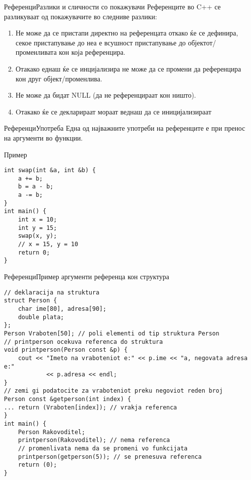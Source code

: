 \begin{frame}[fragile]{Референци}{Разлики и сличности со покажувачи}
Референците во C++ се разликуваат од покажувачите во следниве разлики:
\begin{enumerate}
  \item Не може да се пристапи директно на референцата откако ќе се дефинира,
  секое пристапување до неа е всушност пристапување до објектот/променливата кон
  која референцира.
  \item Отакако еднаш ќе се инцијализира не може да се промени да референцира
  кон друг објект/променлива.
  \item Не може да бидат NULL (да не референцираат кон ништо).
  \item Oтакако ќе се декларираат мораат веднаш да се иницијализираат
\end{enumerate}
\end{frame}

\begin{frame}[fragile]{Референци}{Употреба}
Една од најважните употреби на референците е при пренос на аргументи во функции.
\begin{exampleblock}{Пример}
\begin{lstlisting}
int swap(int &a, int &b) {
    a += b;
    b = a - b;
    a -= b;
}
int main() {
    int x = 10;
    int y = 15;
    swap(x, y);
    // x = 15, y = 10
    return 0;
}
\end{lstlisting}
\end{exampleblock}
\end{frame}

\begin{frame}[fragile]{Референци}{Пример аргументи референца кон структура}
\begin{lstlisting}
// deklaracija na struktura
struct Person {
    char ime[80], adresa[90];
    double plata;
};
Person Vraboten[50]; // poli elementi od tip struktura Person 
// printperson ocekuva referenca do struktura
void printperson(Person const &p) {
    cout << "Imeto na vraboteniot e:" << p.ime << "a, negovata adresa e:"
            << p.adresa << endl;
}
// zemi gi podatocite za vraboteniot preku negoviot reden broj
Person const &getperson(int index) {
... return (Vraboten[index]); // vrakja referenca
}
int main() {
    Person Rakovoditel;
    printperson(Rakovoditel); // nema referenca
    // promenlivata nema da se promeni vo funkcijata
    printperson(getperson(5)); // se prenesuva referenca
    return (0);
}
\end{lstlisting}
\end{frame}

